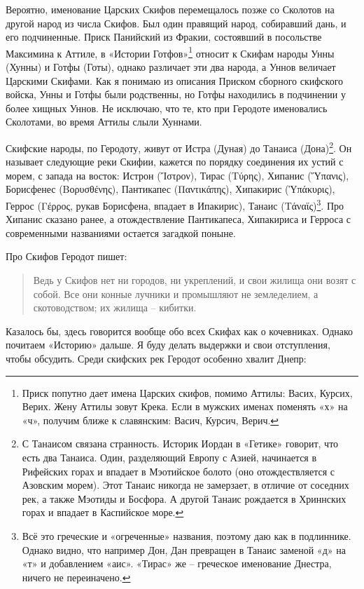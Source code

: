 Вероятно, именование Царских Скифов перемещалось позже со Сколотов на другой народ из числа Скифов. Был один правящий народ, собиравший дань, и его подчиненные. Приск Панийский из Фракии, состоявший в посольстве Максимина к Аттиле, в «Истории Готфов»\footnote{Приск попутно дает имена Царских скифов, помимо Аттилы: Васих, Курсих, Верих. Жену Аттилы зовут Крека. Если в мужских именах поменять «х» на «ч», получим ближе к славянским: Васич, Курсич, Верич.} относит к Скифам народы Унны (Хунны) и Готфы (Готы), однако различает эти два народа, а Уннов величает Царскими Скифами. Как я понимаю из описания Приском сборного скифского войска, Унны и Готфы были родственны, но Готфы находились в подчинении у более хищных Уннов. Не исключаю, что те, кто при Геродоте именовались Сколотами, во время Аттилы слыли Хуннами.

Скифские народы, по Геродоту, живут от Истра (Дуная) до Танаиса (Дона)\footnote{С Танаисом связана странность. Историк Иордан в «Гетике» говорит, что есть два Танаиса. Один, разделяющий Европу с Азией, начинается в Рифейских горах и впадает в Мэотийское болото (оно отождествляется с Азовским морем). Этот Танаис никогда не замерзает, в отличие от соседних рек, а также Мэотиды и Босфора. А другой Танаис рождается в Хриннских горах и впадает в Каспийское море.}. Он называет следующие реки Скифии, кажется по порядку соединения их устий с морем, с запада на восток: Истрон (Ἴστρον), Тирас (Τύρης), Хипанис (Ὕπανις), Борисфенес (Βορυσθένης), Пантикапес (Παντικάπης), Хипакирис (Ὑπάκυρις), Геррос (Γέρρος, рукав Борисфена, впадает в Ипакирис), Танаис (Τάναϊς)\footnote{Всё это греческие и «огреченные» названия, поэтому даю как в подлиннике. Однако видно, что например Дон, Дан превращен в Танаис заменой «д» на «т» и добавлением «аис». «Тирас» же – греческое именование Днестра, ничего не переиначено.}. Про Хипанис сказано ранее, а отождествление Пантикапеса, Хипакириса и Герроса с современными названиями остается загадкой поныне.

Про Скифов Геродот пишет:

\begin{quotation}
Ведь у Скифов нет ни городов, ни укреплений, и свои жилища они возят с собой. Все они конные лучники и промышляют не земледелием, а скотоводством; их жилища – кибитки.
\end{quotation}

Казалось бы, здесь говорится вообще обо всех Скифах как о кочевниках. Однако почитаем «Историю» дальше. Я буду делать выдержки и свои отступления, чтобы обсудить. Среди скифских рек Геродот особенно хвалит Днепр:

